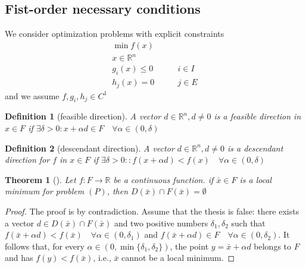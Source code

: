 \documentclass{book}
\newcommand{\R}{\mathbb{R}}
\theoremstyle{theoremv2}
\newtheorem{theorem}{Theorem}[chapter]
\theoremstyle{defv2}
\newtheorem{definition}{Definition}[chapter]
\theoremstyle{remark}
\theoremstyle{remark}
\begin{document}
\subsection{Fist-order necessary conditions}
We consider optimization problems with explicit constraints 
\begin{align*}
    \min f(x) & \\ 
    x\in\R^n & \\ 
    g_i(x) \leq 0 &\qquad  i\in I\\ 
    h_j(x)=0 & \qquad  j\in E
\end{align*}
and we assume $f,g_i,h_j\in C^1$
\begin{definition}[feasible direction]
    A vector $d\in\R^n,d\neq0$ is a feasible direction in $x\in F$ if $\exists \delta>0:x+\alpha d\in F \quad \forall \alpha\in(0,\delta)$
\end{definition}
\begin{definition}[descendant direction]
    A vector $d\in\R^n,d\neq0$ is a descendant direction for $f$ in $x\in F$ if $\exists \delta>0::f(x+\alpha d)< f(x) \quad \forall \alpha\in(0,\delta)$
\end{definition}
\begin{theorem}[]
    \label{intersec}
    Let $f:F\to\R$ be a continuous function. if $\bar{x}\in F$ is a local minimum for problem $(P)$, then $D(\bar{x})\cap F(\bar{x})=\emptyset$
\end{theorem}
\begin{proof}
    The proof is by contradiction. Assume that the thesis is false: there exists a vector $d\in D(\bar{x})\cap F(\bar{x})$ and two positive numbers $\delta_1,\delta_2$ such that $f(\bar{x}+\alpha d) < f(\bar{x}) \quad \forall \alpha\in(0,\delta_1)$ and $f(\bar{x}+\alpha d)\in F \quad \forall \alpha\in(0,\delta_2)$. It follows that, for every $\alpha\in(0,\min\{\delta_1,\delta_2\})$, the point $y=\bar{x}+\alpha d$ belongs to $F$ and has $f(y)<f(\bar{x})$, i.e., $\bar{x}$ cannot be a local minimum.
\end{proof}
\end{document}
